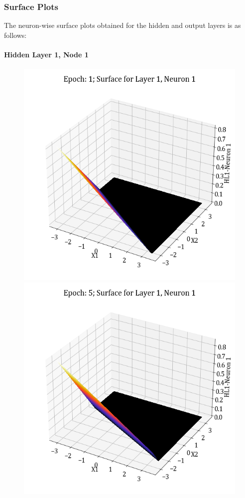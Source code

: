 \documentclass[11pt,a4paper]{article}
\begin{document}
\subsubsection{Surface Plots}
The neuron-wise surface plots obtained for the hidden and output layers is as follows:
\paragraph{Hidden Layer 1, Node 1}
\begin{figure}[H]
    \centering
    \includegraphics[scale=0.4]{images/1B_MLFFNN_E1_HL1_N1.png}
    \includegraphics[scale=0.4]{images/1B_MLFFNN_E5_HL1_N1.png}

\end{figure}
\end{document}
